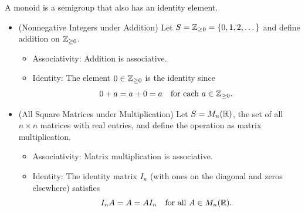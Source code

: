 \documentclass[11pt,openany]{article}
\begin{document}
\vspace{40pt}
\begin{example}
A monoid is a semigroup that also has an identity element. \begin{itemize}
	\item (Nonnegative Integers under Addition) Let $S=\mathbb{Z}_{\geq 0}=\set{0,1,2,\dots}$ and define addition on $\mathbb{Z}_{\geq 0}$. \begin{itemize}
		\item Associativity: Addition is associative.
		\item Identity: The element $0\in\mathbb{Z}_{\geq 0}$ is the identity since \[
		0+a=a+0=a\quad \text{for each}\ a\in\mathbb{Z}_{\geq 0}.
		\]
	\end{itemize}
	\vspace{20pt}
	\item (All Square Matrices under Multiplication) Let $S=M_n(\mathbb{R})$, the set of all $n\times n$ matrices with real entries, and define the operation as matrix multiplication. \begin{itemize}
		\item Associativity: Matrix multiplication is associative.
		\item Identity: The identity matrix $I_n$ (with ones on the diagonal and zeros elsewhere) satisfies \[
		I_nA=A=AI_n\quad\text{for all}\ A\in M_n(\mathbb{R}).
		\]
	\end{itemize}
\end{itemize}
\end{example}
\end{document}
